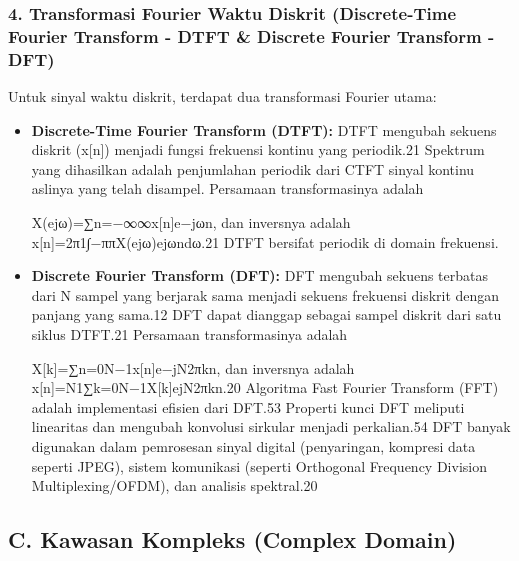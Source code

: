 \documentclass[
  letterpaper,
  DIV=11,
  numbers=noendperiod]{scrreprt}
\begin{document}
\subsubsection{4. Transformasi Fourier Waktu Diskrit (Discrete-Time
Fourier Transform - DTFT \& Discrete Fourier Transform -
DFT)}\label{transformasi-fourier-waktu-diskrit-discrete-time-fourier-transform---dtft-discrete-fourier-transform---dft}

Untuk sinyal waktu diskrit, terdapat dua transformasi Fourier utama:

\begin{itemize}
\item
  \textbf{Discrete-Time Fourier Transform (DTFT):} DTFT mengubah sekuens
  diskrit (x{[}n{]}) menjadi fungsi frekuensi kontinu yang periodik.21
  Spektrum yang dihasilkan adalah penjumlahan periodik dari CTFT sinyal
  kontinu aslinya yang telah disampel. Persamaan transformasinya adalah

  X(ejω)=∑n=−∞∞\hspace{0pt}x{[}n{]}e−jωn, dan inversnya adalah
  x{[}n{]}=2π1\hspace{0pt}∫−ππ\hspace{0pt}X(ejω)ejωndω.21 DTFT bersifat
  periodik di domain frekuensi.
\item
  \textbf{Discrete Fourier Transform (DFT):} DFT mengubah sekuens
  terbatas dari N sampel yang berjarak sama menjadi sekuens frekuensi
  diskrit dengan panjang yang sama.12 DFT dapat dianggap sebagai sampel
  diskrit dari satu siklus DTFT.21 Persamaan transformasinya adalah

  X{[}k{]}=∑n=0N−1\hspace{0pt}x{[}n{]}e−jN2π\hspace{0pt}kn, dan
  inversnya adalah
  x{[}n{]}=N1\hspace{0pt}∑k=0N−1\hspace{0pt}X{[}k{]}ejN2π\hspace{0pt}kn.20
  Algoritma Fast Fourier Transform (FFT) adalah implementasi efisien
  dari DFT.53 Properti kunci DFT meliputi linearitas dan mengubah
  konvolusi sirkular menjadi perkalian.54 DFT banyak digunakan dalam
  pemrosesan sinyal digital (penyaringan, kompresi data seperti JPEG),
  sistem komunikasi (seperti Orthogonal Frequency Division
  Multiplexing/OFDM), dan analisis spektral.20
\end{itemize}

\subsection{C. Kawasan Kompleks (Complex
Domain)}\label{c.-kawasan-kompleks-complex-domain}
\end{document}
